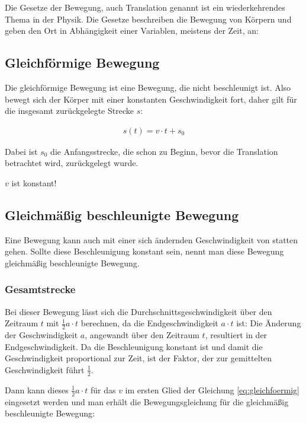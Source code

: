 Die Gesetze der Bewegung, auch Translation genannt ist ein wiederkehrendes Thema in der Physik. Die Gesetze beschreiben die Bewegung von Körpern und geben den Ort in Abhängigkeit einer Variablen, meistens der Zeit, an:

\subsection{Gleichförmige Bewegung} \label{subsec:gleichfoermig}

Die gleichförmige Bewegung ist eine Bewegung, die nicht beschleunigt ist. Also bewegt sich der Körper mit einer konstanten Geschwindigkeit fort, daher gilt für die insgesamt zurückgelegte Strecke $s$:

\begin{align} \label{eq:gleichfoermig}
	s(t) = v \cdot t + s_0
\end{align}

\noindent Dabei ist $s_0$ die Anfangsstrecke, die schon zu Beginn, bevor die Translation betrachtet wird, zurückgelegt wurde.

\begin{Wichtig}
$v$ ist konstant!
\end{Wichtig}

\subsection{Gleichmäßig beschleunigte Bewegung}
Eine Bewegung kann auch mit einer sich ändernden Geschwindigkeit von statten gehen. Sollte diese Beschleunigung konstant sein, nennt man diese Bewegung gleichmäßig beschleunigte Bewegung.

\subsubsection{Gesamtstrecke}

Bei dieser Bewegung lässt sich die Durchschnittsgeschwindigkeit über den Zeitraum $t$ mit $\frac{1}{2}a \cdot t$ berechnen, da die Endgeschwindigkeit $a \cdot t$ ist: Die Änderung der Geschwindigkeit $a$, angewandt über den Zeitraum $t$, resultiert in der Endgeschwindigkeit. Da die Beschleunigung konstant ist und damit die Geschwindigkeit proportional zur Zeit, ist der Faktor, der zur gemittelten Geschwindigkeit führt $\frac{1}{2}$.

Dann kann dieses $\frac{1}{2}a \cdot t$ für das $v$ im ersten Glied der Gleichung \ref{eq:gleichfoermig} eingesetzt werden und man erhält die Bewegungsgleichung für die gleichmäßig beschleunigte Bewegung:

